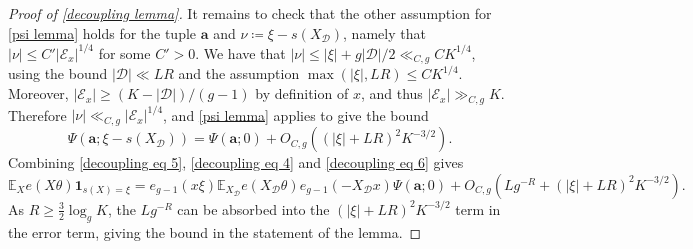 \documentclass[hidelinks,11pt,reqno]{amsart}
\renewcommand{\leq}{\leqslant}
\renewcommand{\geq}{\geqslant}
\newcommand{\E}{\ensuremath{\mathbb{E}}}
\newcommand{\ind}{\mathbf{1}}
\newcommand{\xb}{X}
\newcommand{\xbd}{X_{\mathcal{D}}}
\newcommand{\ru}[1]{e_{g-1}(#1)}
\newcommand{\sx}[1]{s(#1)}
\theoremstyle{remark}
\begin{document}
\begin{proof}[Proof of \cref{decoupling lemma}]
It remains to check that the other assumption for \cref{psi lemma} holds for the tuple $\mathbf{a}$ and $\nu\coloneq \xi-s(\xbd)$, namely that $|\nu|\leq C'|\mathcal{E}_{x}|^{1/4}$ for some $C'>0$. We have that $|\nu|\leq |\xi|+g|\mathcal{D}|/2\ll_{C,g} CK^{1/4}$, using the bound $|\mathcal{D}|\ll LR$ and the assumption $\max(|\xi|,LR)\leq CK^{1/4}$. Moreover, $|\mathcal{E}_{x}|\geq (K-|\mathcal{D}|)/(g-1)$ by definition of $x$, and thus $|\mathcal{E}_{x}|\gg_{C,g} K$. Therefore $|\nu|\ll_{C,g} |\mathcal{E}_{x}|^{1/4}$, and \cref{psi lemma} applies to give the bound
\begin{equation}\label{decoupling eq 6}
    \Psi(\mathbf{a};\xi-\sx{\xbd})=\Psi(\mathbf{a};0)+O_{C,g}((|\xi|+LR)^{2}K^{-3/2}).
\end{equation}
Combining \cref{decoupling eq 5}, \cref{decoupling eq 4} and \cref{decoupling eq 6} gives
    \[\E_{\xb}e(\xb\theta)\ind_{\sx{\xb}=\xi}=\ru{x\xi}\E_{\xbd}e(\xbd\theta)\ru{-\xbd x}\Psi(\mathbf{a};0)+O_{C,g}(Lg^{-R}+(|\xi|+LR)^{2}K^{-3/2}).\]
As $R\geq \tfrac{3}{2}\log_{g}K$, the $Lg^{-R} $ can be absorbed into the $(|\xi|+LR)^{2}K^{-3/2}$ term in the error term, giving the bound in the statement of the lemma.
\end{proof}
\end{document}

